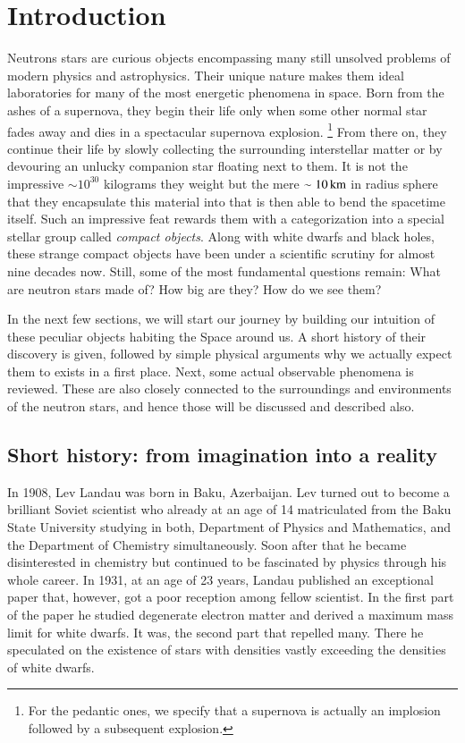 \chapter{Introduction} 
Neutrons stars are curious objects encompassing many still unsolved problems of modern physics and astrophysics.
Their unique nature makes them ideal laboratories for many of the most energetic phenomena in space.
Born from the ashes of a supernova, they begin their life only when some other normal star fades away and dies in a spectacular supernova explosion.%
\footnote{ For the pedantic ones, we specify that a supernova is actually an implosion followed by a subsequent explosion.}
From there on, they continue their life by slowly collecting the surrounding interstellar matter or by devouring an unlucky companion star floating next to them.
It is not the impressive $\sim 10^{30}$ kilograms they weight but the mere $\sim 10 \, \mathrm{km}$ in radius sphere that they encapsulate this material into that is then able to bend the spacetime itself.
Such an impressive feat rewards them with a categorization into a special stellar group called \textit{compact objects}.
Along with white dwarfs and black holes, these strange compact objects have been under a scientific scrutiny for almost nine decades now.
Still, some of the most fundamental questions remain:
What are neutron stars made of?
How big are they?
How do we see them?

In the next few sections, we will start our journey by building our intuition of these peculiar objects habiting the Space around us.
A short history of their discovery is given, followed by simple physical arguments why we actually expect them to exists in a first place.
Next, some actual observable phenomena is reviewed.
These are also closely connected to the surroundings and environments of the neutron stars, and hence those will be discussed and described also.


\section{Short history: from imagination into a reality}

In 1908, Lev Landau was born in Baku, Azerbaijan.
Lev turned out to become a brilliant Soviet scientist who already at an age of 14 matriculated from the Baku State University studying in both, Department of Physics and Mathematics, and the Department of Chemistry simultaneously.
Soon after that he became disinterested in chemistry but continued to be fascinated by physics through his whole career.
In 1931, at an age of 23 years, Landau published an exceptional paper that, however, got a poor reception among fellow scientist.
In the first part of the paper he studied degenerate electron matter and derived a maximum mass limit for white dwarfs.
It was, the second part that repelled many.
There he speculated on the existence of stars with densities vastly exceeding the densities of white dwarfs.

